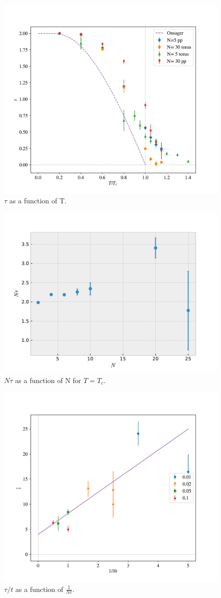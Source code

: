 \documentclass{article}
\begin{document}
\begin{figure}[ht]
  \centering
  \includegraphics[width=.75\textwidth]{media/tau_T}
  \caption{$\tau$ as a function of T.\label{fig:tau_T}}
\end{figure}

\begin{figure}[ht]
  \centering
  \includegraphics[width=.75\textwidth]{media/tau_N}
  \caption{$N\tau$ as a function of N for $T=T_c$.\label{fig:tau_N}}
\end{figure}

\begin{figure}[ht]
  \centering
  \includegraphics[width=.75\textwidth]{media/tau_TN}
  \caption{$\tau/t$ as a function of $\frac{1}{N t}$.\label{fig:tau_TN}}
\end{figure}
\end{document}
